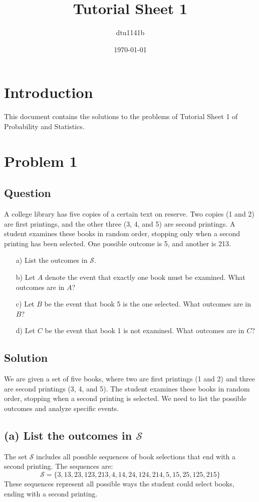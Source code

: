 \documentclass{article}
\title{Tutorial Sheet 1}
\author{dtu1141b}
\date{\today}
\begin{document}
\maketitle

\section*{Introduction}
This document contains the solutions to the problems of Tutorial Sheet 1 of Probability and Statistics.

\section*{Problem 1}
\subsection*{Question}
A college library has five copies of a certain text on reserve. Two copies (1 and 2) are first printings, and the other three (3, 4, and 5) are second printings. A student examines these books in random order, stopping only when a second printing has been selected. One possible outcome is 5, and another is 213.

\begin{enumerate}
    \item[a)] List the outcomes in $\mathcal{S}$.
    \item[b)] Let $A$ denote the event that exactly one book must be examined. What outcomes are in $A$?
    \item[c)] Let $B$ be the event that book 5 is the one selected. What outcomes are in $B$?
    \item[d)] Let $C$ be the event that book 1 is not examined. What outcomes are in $C$?
\end{enumerate}

\subsection*{Solution}

We are given a set of five books, where two are first printings (1 and 2) and three are second printings (3, 4, and 5). The student examines these books in random order, stopping when a second printing is selected. We need to list the possible outcomes and analyze specific events.

\subsection*{(a) List the outcomes in $\mathcal{S}$}
The set $\mathcal{S}$ includes all possible sequences of book selections that end with a second printing. The sequences are:
\[
\mathcal{S} = \{3, 13, 23, 123, 213, 4, 14, 24, 124, 214, 5, 15, 25, 125, 215\}
\]
These sequences represent all possible ways the student could select books, ending with a second printing.
\end{document}

